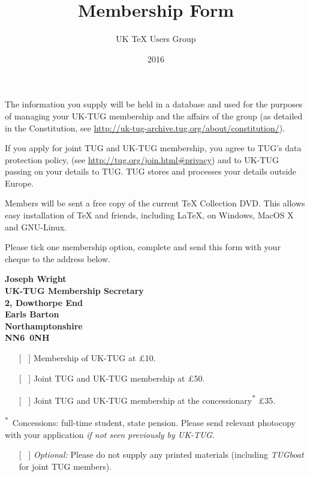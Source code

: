 \documentclass[a4paper,11pt,UKenglish]{article}
\title{Membership Form}
\author{UK \TeX{} Users Group}
\date{2016}
\begin{document}
\thispagestyle{empty}

\begin{minipage}{\textwidth}
  \makeatletter
  {\Large \@author}
  
  \smallskip
  
  {\large \@title{} \@date}
  
  \medskip
\end{minipage}

The information you supply will be held in a database and used for the purposes
of managing your UK-TUG membership and the affairs of the group (as detailed in
the Constitution, see \url{http://uk-tug-archive.tug.org/about/constitution/}).

If you apply for joint TUG and UK-TUG membership, you agree to TUG's data
protection policy, (see \url{http://tug.org/join.html#privacy}) and to UK-TUG
passing on your details to TUG. TUG stores and processes your details outside
Europe.

Members will be sent a free copy of the current \TeX{} Collection DVD. This
allows easy installation of \TeX{} and friends, including \LaTeX{}, on Windows,
MacOS X and GNU-Linux.

Please tick one membership option, complete and send this form with your cheque
to the address below.

\begin{minipage}{\textwidth}
  \bfseries
  Joseph Wright\\
  UK-TUG Membership Secretary\\
  2, Dowthorpe End\\
  Earls Barton\\
  Northamptonshire\\
  NN6~0NH
\end{minipage}

\medskip

\begin{itemize}
  \item [[~]] Membership of UK-TUG at \pounds 10.
  \item [[~]] Joint TUG and UK-TUG membership at \pounds 50.
  \item [[~]] Joint TUG and UK-TUG membership at the 
    concessionary\textsuperscript{*} \pounds 35.
\end{itemize}
\textsuperscript{*}~Concessions: full-time student, state pension. Please send
relevant photocopy with your application \emph{if not seen previously by
UK-TUG}.

\begin{itemize}
  \item [[~]] \emph{Optional:} Please do not supply any printed materials
    (including \emph{TUGboat} for joint TUG members).
\end{itemize}
\end{document}
